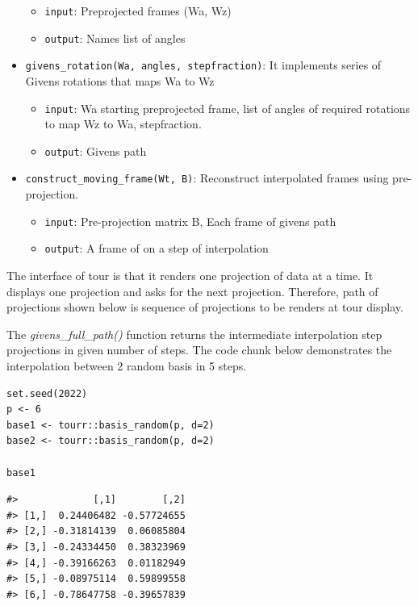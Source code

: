 \begin{itemize}
  \begin{itemize}
  \tightlist
  \item
    \texttt{input}: Preprojected frames (Wa, Wz)
  \item
    \texttt{output}: Names list of angles
  \end{itemize}
\item
  \texttt{givens\_rotation(Wa,\ angles,\ stepfraction)}: It implements series of Givens rotations that maps Wa to Wz

  \begin{itemize}
  \tightlist
  \item
    \texttt{input}: Wa starting preprojected frame, list of angles of required rotations to map Wz to Wa, stepfraction.
  \item
    \texttt{output}: Givens path
  \end{itemize}
\item
  \texttt{construct\_moving\_frame(Wt,\ B)}: Reconstruct interpolated frames using pre-projection.

  \begin{itemize}
  \tightlist
  \item
    \texttt{input}: Pre-projection matrix B, Each frame of givens path
  \item
    \texttt{output}: A frame of on a step of interpolation
  \end{itemize}
\end{itemize}

The interface of tour is that it renders one projection of data at a time. It displays one projection and asks for the next projection. Therefore, path of projections shown below is sequence of projections to be renders at tour display.

The \emph{givens\_full\_path()} function returns the intermediate interpolation step projections in given number of steps. The code chunk below demonstrates the interpolation between 2 random basis in 5 steps.

\begin{verbatim}
set.seed(2022)
p <- 6
base1 <- tourr::basis_random(p, d=2)
base2 <- tourr::basis_random(p, d=2)

base1
\end{verbatim}

\begin{verbatim}
#>             [,1]        [,2]
#> [1,]  0.24406482 -0.57724655
#> [2,] -0.31814139  0.06085804
#> [3,] -0.24334450  0.38323969
#> [4,] -0.39166263  0.01182949
#> [5,] -0.08975114  0.59899558
#> [6,] -0.78647758 -0.39657839
\end{verbatim}


